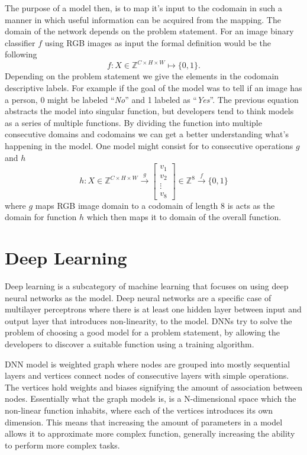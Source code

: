 \documentclass[12pt,a4paper,english
]{tunithesis}
\begin{document}
The purpose of a model then, is to map it's input to the codomain in such a manner in which useful information can be acquired from the mapping.
The domain of the network depends on the problem statement. For an image binary classifier $f$ using RGB images as input the formal definition would be the following
\begin{equation}
  f: X \in \mathbb{Z}^{C \times H \times W} \mapsto \{0, 1\}.
\end{equation}
Depending on the problem statement we give the elements in the codomain descriptive labels. For example if the goal of the model was to tell if an image has a person, 0 might be labeled ``\emph{No}'' and 1 labeled as ``\emph{Yes}''. The previous equation abstracts the model into singular function, but developers tend to think models as a series of multiple functions. By dividing the function into multiple consecutive domains and codomains we can get a better understanding what's happening in the model. One model might consist for to consecutive operations $g$ and $h$
\begin{equation}
  h: X \in \mathbb{Z}^{C \times H \times W} \xrightarrow{g}
\begin{bmatrix} v_1 \\ v_2 \\ \vdots \\ v_8 \end{bmatrix}
\in \mathbb{Z}^8 \xrightarrow{f} \{0, 1\}
\end{equation}
where $g$ maps RGB image domain to a codomain of length 8 is acts as the domain for function $h$ which then maps it to domain of the overall function.


\section{Deep Learning}
Deep learning is a subcategory of machine learning that focuses on using deep neural networks as the model. Deep neural networks are a specific case of multilayer perceptrons where there is at least one hidden layer between input and output layer that introduces non-linearity, to the model. DNNs try to solve the problem of choosing a good model for a problem statement, by allowing the developers to discover a suitable function using a training algorithm.

DNN model is weighted graph where nodes are grouped into mostly sequential layers and vertices connect nodes of consecutive layers with simple operations. The vertices hold weights and biases signifying the amount of association between nodes. Essentially what the graph models is, is a N-dimensional space which the non-linear function inhabits, where each of the vertices introduces its own dimension.
This means that increasing the amount of parameters in a model allows it to approximate more complex function, generally increasing the ability to perform more complex tasks.~\cite{sze_efficient_2017}
\end{document}
